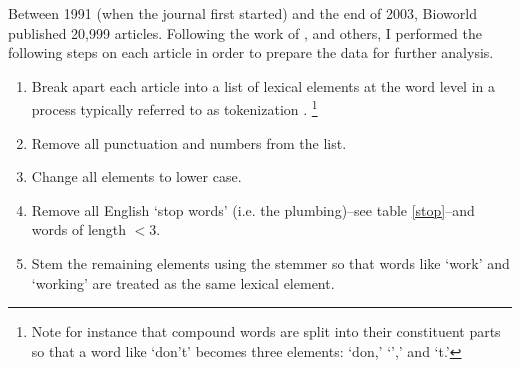Between 1991 (when the journal first started) and the end of 2003, Bioworld published 20,999 articles. Following the work of \citet{klingenstein2014}, \citet{tirunillai2014} and others, I performed the following steps on each article in order to prepare the data for further analysis.
\begin{small}
\begin{enumerate}
  \item Break apart each article into a list of lexical elements at the word level in a process typically referred to as tokenization \citep{jurafsky2000}. \footnote{Note for instance that compound words are split into their constituent parts so that a word like `don't' becomes three elements: `don,' `',' and `t.'}
  \item Remove all punctuation and numbers from the list.
  \item Change all elements to lower case.
  \item Remove all English `stop words' (i.e. the plumbing)--see table \ref{stop}--and words of length $< 3$.
  \item Stem the remaining elements using the \citet{porter1980} stemmer so that words like `work' and `working' are treated as the same lexical element.
\end{enumerate}
\end{small}

